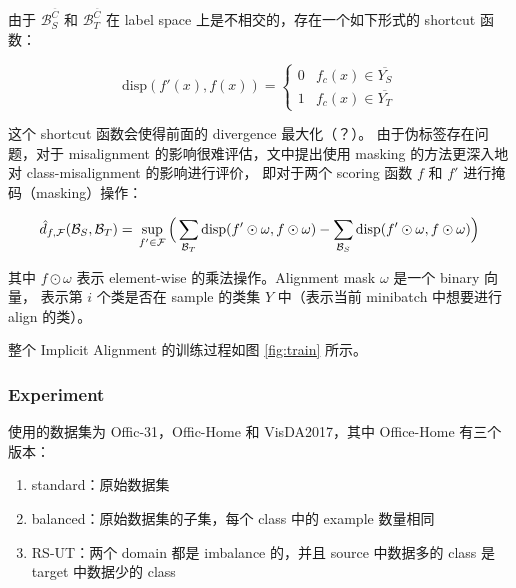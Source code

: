 \documentclass[UTF8]{ctexart}
\begin{document}
                由于 $\mathcal{B}^{\overline{C}}_{S}$ 和 $\mathcal{B}^{\overline{C}}_{T}$ 在 label space 上是不相交的，存在一个如下形式的 shortcut 函数：

                \begin{equation}
                    \text{disp}(f'(x),f(x))=\left\{
                    \begin{matrix}
                    0 & f_c(x)\in \overline{Y_{S}}\\ 
                    1 & f_c(x)\in \overline{Y_{T}}
                    \end{matrix}\right.
                \end{equation}

                这个 shortcut 函数会使得前面的 divergence 最大化（？）。
                由于伪标签存在问题，对于 misalignment 的影响很难评估，文中提出使用 masking 的方法更深入地对 class-misalignment 的影响进行评价，
                即对于两个 scoring 函数 $f$ 和 $f'$ 进行掩码（masking）操作：

                $$
                    \hat{d}_{f,\mathcal F}( \mathcal{B}_S, \mathcal{B}_T) =\\
                    \sup_{f'\in\mathcal F}\Big{(}\sum_{\mathcal{B}_T}\text{disp}(f'\odot\omega,f\odot\omega)-\sum_{\mathcal{B}_S}\text{disp}(f'\odot\omega,f\odot\omega)\Big{)}
                $$

                其中 $f\odot\omega$ 表示 element-wise 的乘法操作。Alignment mask $\omega$ 是一个 binary 向量，
                表示第 $i$ 个类是否在 sample 的类集 $Y$ 中（表示当前 minibatch 中想要进行 align 的类）。

                整个 Implicit Alignment 的训练过程如图 \ref{fig:train} 所示。

            \subsubsection{Experiment}
                使用的数据集为 Offic-31，Offic-Home 和 VisDA2017，其中 Office-Home 有三个版本：

                \begin{enumerate}
                    \item standard：原始数据集
                    \item balanced：原始数据集的子集，每个 class 中的 example 数量相同
                    \item RS-UT：两个 domain 都是 imbalance 的，并且 source 中数据多的 class 是 target 中数据少的 class
                \end{enumerate}
\end{document}
